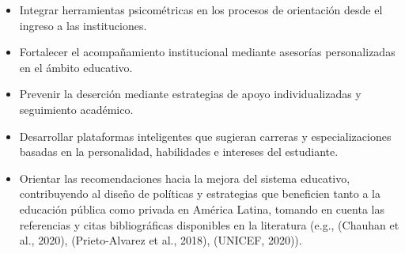 \begin{itemize}
    \item Integrar herramientas psicométricas en los procesos de orientación desde el ingreso a las instituciones.
    \item Fortalecer el acompañamiento institucional mediante asesorías personalizadas en el ámbito educativo.
    \item Prevenir la deserción mediante estrategias de apoyo individualizadas y seguimiento académico.
    \item Desarrollar plataformas inteligentes que sugieran carreras y especializaciones basadas en la personalidad, habilidades e intereses del estudiante.
    \item Orientar las recomendaciones hacia la mejora del sistema educativo, contribuyendo al diseño de políticas y estrategias que beneficien tanto a la educación pública como privada en América Latina, tomando en cuenta las referencias y citas bibliográficas disponibles en la literatura (e.g., (Chauhan et al., 2020), (Prieto-Alvarez et al., 2018), (UNICEF, 2020)).
\end{itemize}